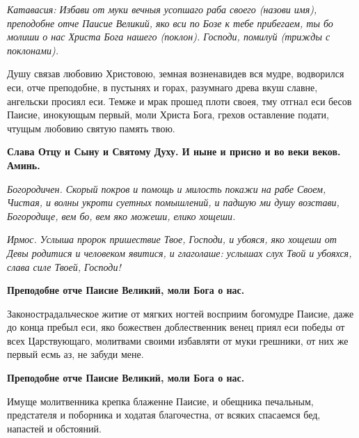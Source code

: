 \itshape Катавасия:\normalfont{} Избави от муки вечныя усопшаго раба своего (\itshape назови имя\normalfont{}), преподобне отче Паисие Великий, яко вси по Бозе к тебе прибегаем, ты бо молиши о нас Христа Бога нашего (\itshape поклон\normalfont{}). Господи, помилуй (\itshape трижды с поклонами\normalfont{}). 








Душу связав любовию Христовою, земная возненавидев вся мудре, водворился еси, отче преподобне, в пустынях и горах, разумнаго древа вкуш славне, ангельски просиял еси. Темже и мрак прошед плоти своея, тму отгнал еси бесов Паисие, инокующым первый, моли Христа Бога, грехов оставление подати, чтущым любовию святую память твою. 




\bfseries Слава Отцу и Сыну и Святому Духу. И ныне и присно и во веки веков. Аминь.\normalfont{}




\itshape Богородичен.\normalfont{} Скорый покров и помощь и милость покажи на рабе Своем, Чистая, и волны укроти суетных помышлений, и падшую ми душу возстави, Богородице, вем бо, вем яко можеши, елико хощеши. 








\itshape Ирмос.\normalfont{} Услыша пророк пришествие Твое, Господи, и убояся, яко хощеши от Девы родитися и человеком явитися, и глаголаше: услышах слух Твой и убояхся, слава силе Твоей, Господи! 




\bfseries Преподобне отче Паисие Великий, моли Бога о нас.\normalfont{}




Законострадальческое житие от мягких ногтей восприим богомудре Паисие, даже до конца пребыл еси, яко божествен доблественник венец приял еси победы от всех Царствующаго, молитвами своими избавляти от муки грешники, от них же первый есмь аз, не забуди мене. 




\bfseries Преподобне отче Паисие Великий, моли Бога о нас.\normalfont{}




Имуще молитвенника крепка блаженне Паисие, и обещника печальным, предстателя и поборника и ходатая благочестна, от всяких спасаемся бед, напастей и обстояний. 




